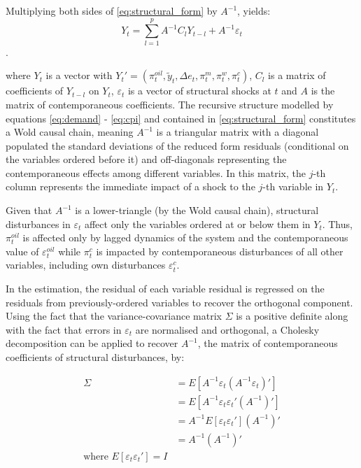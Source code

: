 \documentclass[12pt]{article}
\begin{document}
Multiplying both sides of \eqref{eq:structural_form} by $A^{-1}$, yields: \begin{equation}\label{eq:reduced_form} Y_t =   \sum_{l=1}^{p}A^{-1}C_{l}Y_{t-l} +  A^{-1}\varepsilon_t \end{equation}.

where $Y_t$ is a vector with $Y_t' = (\pi^{oil}_{t}, \tilde{y}_{t}, \Delta e_{t}, \pi_t^m, \pi_t^w, \pi_t^c)$, $C_{l}$ is a matrix of coefficients of $Y_{t-l}$ on $Y_t$,  $\varepsilon_t$ is a vector of structural shocks at $t$ and $A$ is the matrix of contemporaneous coefficients. The recursive structure modelled by equations \eqref{eq:demand} - \eqref{eq:cpi} and contained in \eqref{eq:structural_form} constitutes a Wold causal chain, meaning $A^{-1}$ is a triangular matrix with a diagonal populated the standard deviations of the reduced form residuals (conditional on the variables ordered before it) and off-diagonals representing the contemporaneous effects among different variables. In this matrix, the $j$-th column represents the immediate impact of a shock to the $j$-th variable in $Y_t$.

Given that $A^{-1}$ is a lower-triangle (by the Wold causal chain), structural disturbances in $\varepsilon_t$ affect only the variables ordered at or below them in $Y_t$. Thus, $\pi^{oil}_{t}$ is affected only by lagged dynamics of the system and the contemporaneous value of $\varepsilon^{oil}_{t}$ while $\pi^{c}_{t}$ is impacted by contemporaneous disturbances of all other variables, including own disturbances $\varepsilon^{c}_{t}$. 

In the estimation, the residual of each variable residual is regressed on the residuals from previously-ordered variables to recover the orthogonal component. Using the fact that the variance-covariance matrix $\Sigma$ is a positive definite along with the fact that errors in $\varepsilon_t$ are normalised and orthogonal, a Cholesky decomposition can be applied to recover $A^{-1}$, the matrix of contemporaneous coefficients of structural disturbances, by:  

\begin{align} 
\Sigma  &= E[A^{-1}\varepsilon_t (A^{-1}\varepsilon_t)']\\ 
&= E[A^{-1}\varepsilon_t \varepsilon_t'({A^{-1}})'] \\
&=  A^{-1}E[\varepsilon_t \varepsilon_{t}']({A^{-1}})' \\
 &= A^{-1}({A^{-1}})' \\ \text{where } E[\varepsilon_t \varepsilon_t'] = I 
 \end{align}
\end{document}
